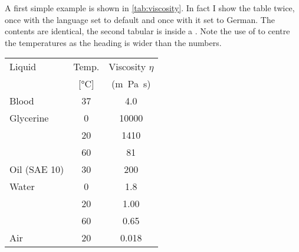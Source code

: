 A first simple example is shown in \cref{tab:viscosity}.
In fact I show the table twice, once
with the language set to default and once with it set to German. The
 contents are identical, the second tabular is inside a
. Note the use of
to centre the temperatures as the heading is wider than the numbers.

\begin{table}[htbp]
  \centering
  \begin{tabular}{lS[table-format = 4.2]S}
    \toprule
    Liquid & {Temp.} & {Viscosity \(\eta\)}\\
    &  {[\si{\celsius}]} & {(\si{\metre\pascal\second})} \\
    \midrule
    Blood     & 37 & 4.0 \\
    Glycerine &  0 & 10000 \\
    & 20 & 1410 \\
    & 60 & 81 \\
    Oil (SAE 10) & 30 & 200 \\
    Water   &  0 & 1.8 \\
    & 20 & 1.00 \\
    & 60 & 0.65 \\
    Air     & 20 & 0.018 \\
    \bottomrule
  \end{tabular}
  \quad

\end{table}
